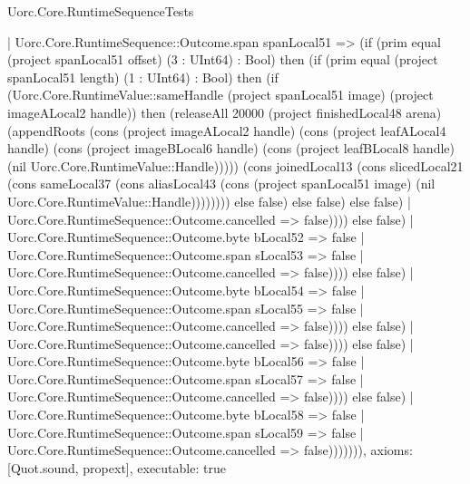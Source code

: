 \begin{lexlean}{Uorc.Core.RuntimeSequenceTests}
\begin{semanticmodule}
{                                              | Uorc.Core.RuntimeSequence::Outcome.span spanLocal51 => (if (prim equal (project spanLocal51 offset) (3 : UInt64) : Bool) then (if (prim equal (project spanLocal51 length) (1 : UInt64) : Bool) then (if (Uorc.Core.RuntimeValue::sameHandle (project spanLocal51 image) (project imageALocal2 handle)) then (releaseAll 20000 (project finishedLocal48 arena) (appendRoots (cons (project imageALocal2 handle) (cons (project leafALocal4 handle) (cons (project imageBLocal6 handle) (cons (project leafBLocal8 handle) (nil Uorc.Core.RuntimeValue::Handle))))) (cons joinedLocal13 (cons slicedLocal21 (cons sameLocal37 (cons aliasLocal43 (cons (project spanLocal51 image) (nil Uorc.Core.RuntimeValue::Handle)))))))) else false) else false) else false)
                                              | Uorc.Core.RuntimeSequence::Outcome.cancelled => false)))) else false)
                                        | Uorc.Core.RuntimeSequence::Outcome.byte bLocal52 => false
                                        | Uorc.Core.RuntimeSequence::Outcome.span sLocal53 => false
                                        | Uorc.Core.RuntimeSequence::Outcome.cancelled => false)))) else false)
                                  | Uorc.Core.RuntimeSequence::Outcome.byte bLocal54 => false
                                  | Uorc.Core.RuntimeSequence::Outcome.span sLocal55 => false
                                  | Uorc.Core.RuntimeSequence::Outcome.cancelled => false)))) else false)
                            | Uorc.Core.RuntimeSequence::Outcome.cancelled => false)))) else false)
                      | Uorc.Core.RuntimeSequence::Outcome.byte bLocal56 => false
                      | Uorc.Core.RuntimeSequence::Outcome.span sLocal57 => false
                      | Uorc.Core.RuntimeSequence::Outcome.cancelled => false)))) else false)
                | Uorc.Core.RuntimeSequence::Outcome.byte bLocal58 => false
                | Uorc.Core.RuntimeSequence::Outcome.span sLocal59 => false
                | Uorc.Core.RuntimeSequence::Outcome.cancelled => false))))))),
  axioms: [Quot.sound, propext],
  executable: true
}


\end{semanticmodule}
\end{lexlean}
